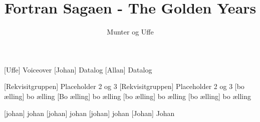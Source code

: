 \documentclass[a4paper,11pt]{article}
\title{Fortran Sagaen - The Golden Years}
\author{Munter og Uffe}
\begin{document}
\maketitle

\begin{roles}
[Uffe] Voiceover
[Johan] Datalog
[Allan] Datalog
\end{roles}

\begin{props}
[Rekvisitgruppen] Placeholder 2 og 3
[Rekvisitgruppen] Placeholder 2 og 3
[bo ælling] bo ælling
[Bo ælling] bo ælling
[bo ælling] bo ælling
[bo ælling] bo ælling

[johan] johan
[johan] johan
[johan] johan
[Johan] Johan

\end{props}
\end{document}
